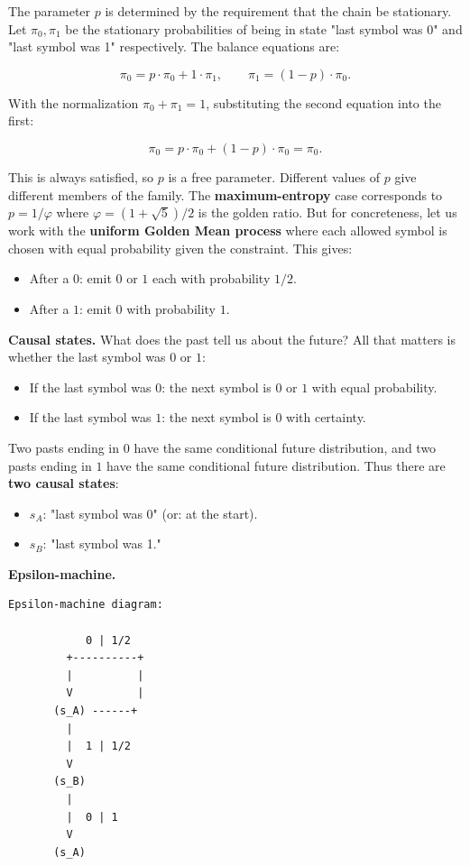 The parameter $p$ is determined by the requirement that the chain be stationary. Let $\pi_0, \pi_1$ be the stationary probabilities of being in state "last symbol was 0" and "last symbol was 1" respectively. The balance equations are:

\[\pi_0 = p \cdot \pi_0 + 1 \cdot \pi_1, \qquad \pi_1 = (1-p) \cdot \pi_0.\]

With the normalization $\pi_0 + \pi_1 = 1$, substituting the second equation into the first:

\[\pi_0 = p \cdot \pi_0 + (1-p) \cdot \pi_0 = \pi_0.\]

This is always satisfied, so $p$ is a free parameter. Different values of $p$ give different members of the family. The \textbf{maximum-entropy} case corresponds to $p = 1/\varphi$ where $\varphi = (1+\sqrt{5})/2$ is the golden ratio. But for concreteness, let us work with the \textbf{uniform Golden Mean process} where each allowed symbol is chosen with equal probability given the constraint. This gives:

\begin{itemize}
\item After a $0$: emit $0$ or $1$ each with probability $1/2$.
\item After a $1$: emit $0$ with probability $1$.
\end{itemize}

\textbf{Causal states.} What does the past tell us about the future? All that matters is whether the last symbol was $0$ or $1$:

\begin{itemize}
\item If the last symbol was $0$: the next symbol is $0$ or $1$ with equal probability.
\item If the last symbol was $1$: the next symbol is $0$ with certainty.
\end{itemize}

Two pasts ending in $0$ have the same conditional future distribution, and two pasts ending in $1$ have the same conditional future distribution. Thus there are \textbf{two causal states}:

\begin{itemize}
\item $s_A$: "last symbol was 0" (or: at the start).
\item $s_B$: "last symbol was 1."
\end{itemize}

\textbf{Epsilon-machine.}

\begin{verbatim}
Epsilon-machine diagram:

            0 | 1/2
         +----------+
         |          |
         V          |
       (s_A) ------+
         |
         |  1 | 1/2
         V
       (s_B)
         |
         |  0 | 1
         V
       (s_A)
\end{verbatim}

